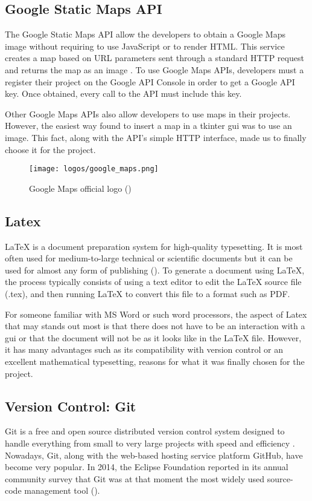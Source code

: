 	\subsection{Google Static Maps API}
	The Google Static Maps API allow the developers to obtain a Google Maps image without requiring to use JavaScript or to render HTML. This service creates a map based on URL parameters sent through a standard HTTP request and returns the map as an image \cite{google_maps_static}. To use Google Maps APIs, developers must a register their project on the Google API Console in order to get a Google API key. Once obtained, every call to the API must include this key.

	Other Google Maps APIs also allow developers to use maps in their projects. However, the easiest way found to insert a map in a tkinter \gls{gui} was to use an image. This fact, along with the API's simple HTTP interface, made us to finally choose it for the project.

	\begin{figure}[!ht]
		\centering
		\texttt{[image: logos/google\_maps.png]}
		\caption{Google Maps official logo (\cite{google_maps_static})}
		\label{fig:google_maps}
	\end{figure}

	\subsection{Latex}
	\LaTeX{} is a document preparation system for high-quality typesetting. It is most often used for medium-to-large technical or scientific documents but it can be used for almost any form of publishing (\cite{latex_main}). To generate a document using LaTeX, the process typically consists of using a text editor to edit the LaTeX source file (.tex), and then running LaTeX to convert this file to a format such as PDF.

	For someone familiar with MS Word or such word processors, the aspect of Latex that may stands out most is that there does not have to be an interaction with a \gls{gui} or that the document will not be as it looks like in the LaTeX file. However, it has many advantages such as its compatibility with version control or an excellent mathematical typesetting, reasons for what it was finally chosen for the project.

	\subsection{Version Control: Git}
	Git is a free and open source distributed version control system designed to handle everything from small to very large projects with speed and efficiency \cite{git_about}. Nowadays, Git, along with the web-based hosting service platform GitHub, have become very popular. In 2014, the Eclipse Foundation reported in its annual community survey that Git was at that moment the most widely used source-code management tool (\cite{git_popular}). 

